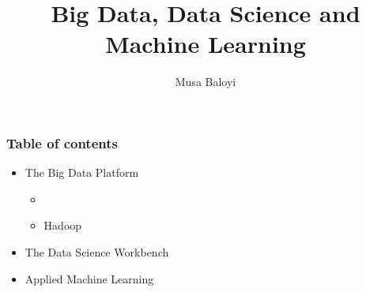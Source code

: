 \documentclass[11pt]{beamer}
\begin{document}
	\author{Musa Baloyi}
	\title{Big Data, Data Science and Machine Learning}
	\begin{frame}[plain]
	\maketitle
\end{frame}

\begin{frame}
\frametitle{Table of contents}
\begin{itemize}
	\item The Big Data Platform
	\begin{itemize}
		\item 
		\item Hadoop
	\end{itemize}
	\item The Data Science Workbench
	\item Applied Machine Learning
\end{itemize}
\end{frame}


%
%
\end{document}
